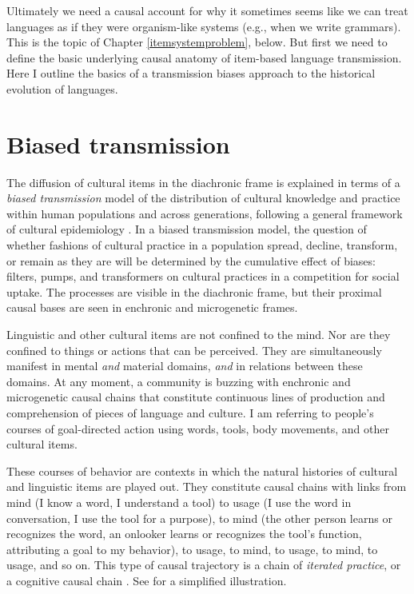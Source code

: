 Ultimately we need a causal account for why it sometimes seems like we 
can treat languages as if they were organism-like systems (e.g., when we 
write grammars). This is the topic of Chapter \ref{itemsystemproblem}, below. But first we need to define the basic underlying causal anatomy of item-based 
language transmission. Here I outline the basics of a transmission 
biases approach to the historical evolution of languages. 



\section{Biased transmission}


The diffusion of cultural items in the diachronic frame is explained in terms of a \textit{biased transmission} model of the distribution of cultural knowledge 
and practice within human populations and across generations, following 
a general framework of cultural epidemiology \citep{sperber_anthropology_1985,sperber_explaining_1996,boyd_culture_1985,boyd_origin_2005,enfield_linguistic_2003,enfield_transmission_2008}. In a biased transmission model, the question of whether 
fashions of cultural practice in a population spread, decline, 
transform, or remain as they are will be determined by the cumulative 
effect of biases: filters, pumps, and transformers 
on cultural practices in a competition for social uptake. The processes are visible in the diachronic frame, but their proximal causal bases are seen in enchronic and microgenetic frames.



Linguistic and other cultural items are not confined to the mind. Nor are they confined to things or actions that can be perceived. They are simultaneously manifest in mental \textit{and} 
material domains, \textit{and} in relations between these domains. At 
any moment, a community is buzzing with enchronic and microgenetic causal chains that constitute continuous lines of 
production and comprehension of pieces of language and culture. I am 
referring to people's courses of goal-directed action using words, tools, body movements, 
and other cultural items. 



These courses of behavior are contexts in which the natural 
histories of cultural and linguistic items are played out. They 
constitute causal chains with links from mind (I know a word, I 
understand a tool) to usage (I use the word in conversation, I 
use the tool for a purpose), to mind (the other person learns or recognizes 
the word, an onlooker learns or recognizes the tool's 
function, attributing a goal to my behavior), to usage, to mind, to 
usage, to mind, to usage, and so on. This type of causal 
trajectory is a chain of \textit{iterated practice}, or a cognitive 
causal chain \citep{sperber_why_2006-1}. See  for a simplified illustration.






